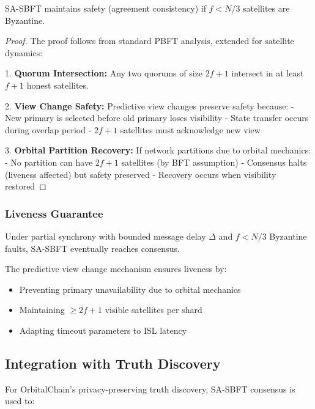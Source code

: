 \begin{theorem}
SA-SBFT maintains safety (agreement consistency) if $f < N/3$ satellites are Byzantine.
\end{theorem}

\begin{proof}
The proof follows from standard PBFT analysis, extended for satellite dynamics:

1. \textbf{Quorum Intersection:} Any two quorums of size $2f+1$ intersect in at least $f+1$ honest satellites.

2. \textbf{View Change Safety:} Predictive view changes preserve safety because:
   - New primary is selected before old primary loses visibility
   - State transfer occurs during overlap period
   - $2f+1$ satellites must acknowledge new view

3. \textbf{Orbital Partition Recovery:} If network partitions due to orbital mechanics:
   - No partition can have $2f+1$ satellites (by BFT assumption)
   - Consensus halts (liveness affected) but safety preserved
   - Recovery occurs when visibility restored
\end{proof}

\subsubsection{Liveness Guarantee}

\begin{theorem}
Under partial synchrony with bounded message delay $\Delta$ and $f < N/3$ Byzantine faults, SA-SBFT eventually reaches consensus.
\end{theorem}

The predictive view change mechanism ensures liveness by:
\begin{itemize}
    \item Preventing primary unavailability due to orbital mechanics
    \item Maintaining $\geq 2f+1$ visible satellites per shard
    \item Adapting timeout parameters to ISL latency
\end{itemize}


\subsection{Integration with Truth Discovery}

For OrbitalChain's privacy-preserving truth discovery, SA-SBFT consensus is used to:

